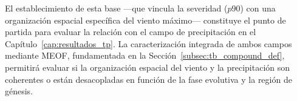 El establecimiento de esta base ---que vincula la severidad ($p90$) con una organización espacial específica del viento máximo--- constituye el punto de partida para evaluar la relación con el campo de precipitación en el Capítulo~\ref{cap:resultados_tp}. 
La caracterización integrada de ambos campos mediante MEOF, fundamentada en la Sección~\ref{subsec:tb_compound_def}, permitirá evaluar si la organización espacial del viento y la precipitación son coherentes o están desacopladas en función de la fase evolutiva y la región de génesis.
